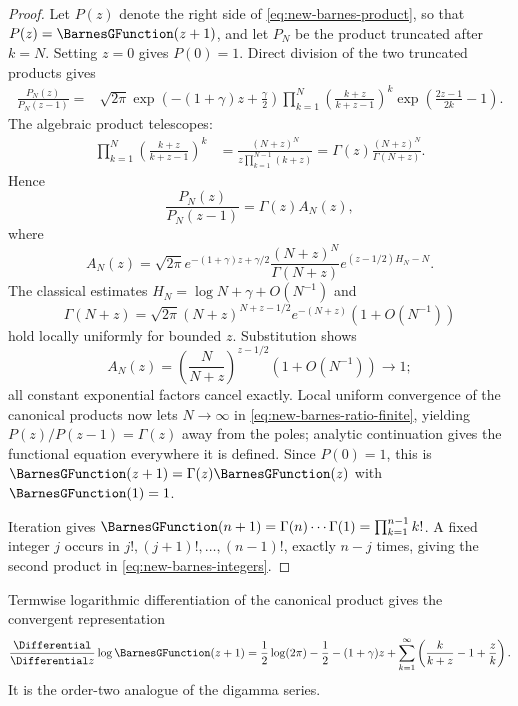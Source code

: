 \documentclass[11pt,a4paper,oneside,openany]{book}
\theoremstyle{definition}
\theoremstyle{remark}
\begin{document}
\begin{proof}
Let $P(z)$ denote the right side of \eqref{eq:new-barnes-product}, so that
$P(z)=\BarnesGFunction(z+1)$, and let $P_N$ be the product truncated after $k=N$.  Setting
$z=0$ gives $P(0)=1$.  Direct division of the two truncated products gives
\begin{align*}
 \frac{P_N(z)}{P_N(z-1)}
 ={}&\sqrt{2\pi}
 \exp\left(-(1+\gamma)z+\frac\gamma2\right)
 \prod_{k=1}^N
 \left(\frac{k+z}{k+z-1}\right)^k
 \exp\left(\frac{2z-1}{2k}-1\right).
\end{align*}
The algebraic product telescopes:
\begin{align*}
 \prod_{k=1}^N\left(\frac{k+z}{k+z-1}\right)^k
 &=\frac{(N+z)^N}{z\prod_{k=1}^{N-1}(k+z)}
 =\Gamma(z)\frac{(N+z)^N}{\Gamma(N+z)}.
\end{align*}
Hence
\begin{equation}\label{eq:new-barnes-ratio-finite}
 \frac{P_N(z)}{P_N(z-1)}
 =\Gamma(z)A_N(z),
\end{equation}
where
\[
 A_N(z)=\sqrt{2\pi}
 e^{-(1+\gamma)z+\gamma/2}
 \frac{(N+z)^N}{\Gamma(N+z)}
 e^{(z-1/2)H_N-N}.
\]
The classical estimates
$H_N=\log N+\gamma+O(N^{-1})$ and
\[
 \Gamma(N+z)=\sqrt{2\pi}
 (N+z)^{N+z-1/2}e^{-(N+z)}(1+O(N^{-1}))
\]
hold locally uniformly for bounded $z$.  Substitution shows
\[
 A_N(z)=
 \left(\frac{N}{N+z}\right)^{z-1/2}(1+O(N^{-1}))\longrightarrow1;
\]
all constant exponential factors cancel exactly.  Local uniform convergence of
the canonical products now lets $N\to\infty$ in
\eqref{eq:new-barnes-ratio-finite}, yielding
$P(z)/P(z-1)=\Gamma(z)$ away from the poles; analytic continuation gives the
functional equation everywhere it is defined.  Since $P(0)=1$, this is
$\BarnesGFunction(z+1)=\Gamma(z)\BarnesGFunction(z)$ with $\BarnesGFunction(1)=1$.

Iteration gives
$\BarnesGFunction(n+1)=\Gamma(n)\cdots\Gamma(1)=\prod_{k=1}^{n-1}k!$.  A fixed integer
$j$ occurs in $j!, (j+1)!,\ldots,(n-1)!$, exactly $n-j$ times, giving the
second product in \eqref{eq:new-barnes-integers}.
\end{proof}

Termwise logarithmic differentiation of the canonical product gives the
convergent representation
\begin{equation}\label{eq:new-barnes-log-derivative}
 \frac{\Differential}{\Differential z}\log \BarnesGFunction(z+1)
 =\frac12\log(2\pi)-\frac12-(1+\gamma)z
 +\sum_{k=1}^{\infty}
 \left(\frac{k}{k+z}-1+\frac zk\right).
\end{equation}
It is the order-two analogue of the digamma series.
\end{document}
